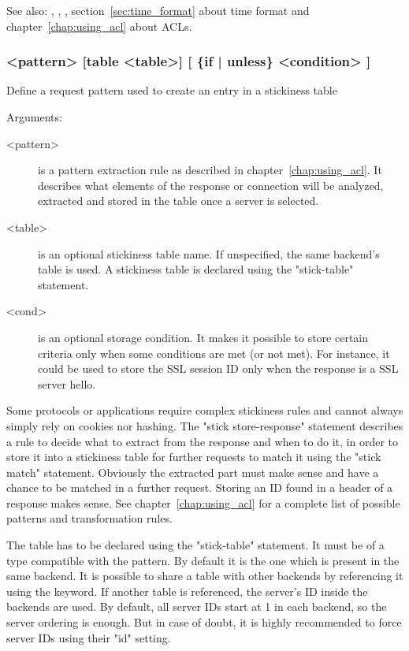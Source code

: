 See also: , , , section~\ref{sec:time_format}
             about time format and chapter~\ref{chap:using_acl} about ACLs.

\subsubsection[stick store-response]{ <pattern> [table <table>] [ \{if | unless\} <condition> ]}

  Define a request pattern used to create an entry in a stickiness table
  

  Arguments:
  \begin{description}
  \item[<pattern>] is a pattern extraction rule as described in chapter~\ref{chap:using_acl}. It
               describes what elements of the response or connection will
               be analyzed, extracted and stored in the table once a
               server is selected.

  \item[<table>] is an optional stickiness table name. If unspecified, the same
               backend's table is used. A stickiness table is declared using
               the "stick-table" statement.

  \item[<cond>] is an optional storage condition. It makes it possible to store
               certain criteria only when some conditions are met (or not met).
               For instance, it could be used to store the SSL session ID only
               when the response is a SSL server hello.
  \end{description}

  Some protocols or applications require complex stickiness rules and cannot
  always simply rely on cookies nor hashing. The "stick store-response"
  statement  describes a rule to decide what to extract from the response and
  when to do it, in order to store it into a stickiness table for further
  requests to match it using the "stick match" statement. Obviously the
  extracted part must make sense and have a chance to be matched in a further
  request. Storing an ID found in a header of a response makes sense.
  See chapter~\ref{chap:using_acl} for a complete list of possible patterns and transformation
  rules.

  The table has to be declared using the "stick-table" statement. It must be of
  a type compatible with the pattern. By default it is the one which is present
  in the same backend. It is possible to share a table with other backends by
  referencing it using the  keyword. If another table is referenced,
  the server's ID inside the backends are used. By default, all server IDs
  start at 1 in each backend, so the server ordering is enough. But in case of
  doubt, it is highly recommended to force server IDs using their "id" setting.

